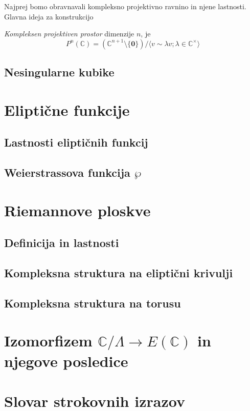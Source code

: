 \documentclass[mat1]{fmfdelo}
\newcommand{\C}{\mathbb C}
\begin{document}
Najprej bomo obravnavali kompleksno projektivno ravnino in njene lastnosti. Glavna ideja za konstrukcijo 
\begin{definicija}
\emph{Kompleksen projektiven prostor} dimenzije $n$, je 
\begin{equation*}
    P^n(\C) = (\C^{n+1} \setminus \{\bm0 \}) / \langle v \sim \lambda v; \lambda \in \C^{\times} \rangle
\end{equation*}
\end{definicija}



\subsection{Nesingularne kubike}
\break

\section{Eliptične funkcije} \label{elipticne funkcije}
\subsection{Lastnosti eliptičnih funkcij}
\subsection{Weierstrassova funkcija $\wp$}
\break

\section{Riemannove ploskve} \label{riemannove ploskve}
\subsection{Definicija in lastnosti}
\subsection{Kompleksna struktura na eliptični krivulji}
\subsection{Kompleksna struktura na torusu}
\break

\section{Izomorfizem \texorpdfstring{$\C/\Lambda \to E(\C)$}{} in njegove posledice} \label{poglavje izomorfizem}
\break

\section*{Slovar strokovnih izrazov}

\geslo{}{}
\geslo{}{}

\begin{thebibliography}{99}


\end{thebibliography}
\end{document}
